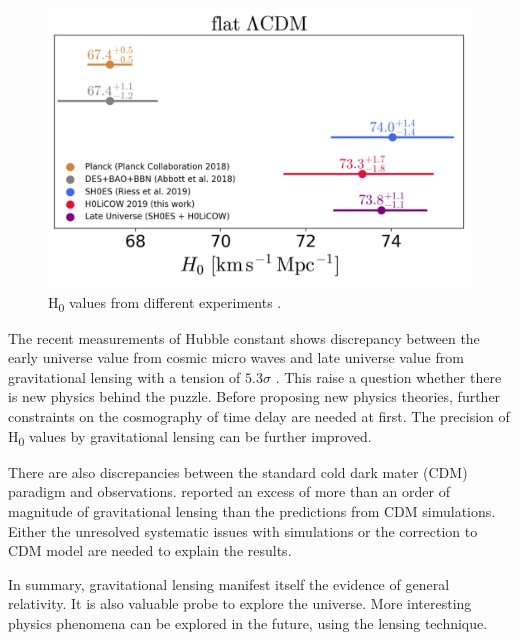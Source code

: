 \documentclass[letter,12pt]{article}
\begin{document}
\begin{figure}[htbp]
\centering
\includegraphics[width=.9\linewidth]{./figures/H0discrepancy.png}
\caption{\label{fig:orgcaf3856}H\textsubscript{0} values from different experiments \citep{Planck2018results,Abbott_2018,Riess_2019,Wong2019}.}
\end{figure}

The recent measurements of Hubble constant shows discrepancy between
the early universe value from cosmic micro waves and late universe
value from gravitational lensing with a tension of \(5.3\sigma\)
\citep{Wong2019}. This raise a question whether there is new physics
behind the puzzle. Before proposing new physics theories, further
constraints on the cosmography of time delay are needed at
first. The precision of H\textsubscript{0} values by gravitational lensing can be
further improved.

There are also discrepancies between the standard cold dark mater
(CDM) paradigm and observations. \cite{Meneghetti_2020} reported an
excess of more than an order of magnitude of gravitational lensing
than the predictions from CDM simulations. Either the unresolved
systematic issues with simulations or the correction to CDM model
are needed to explain the results.

In summary, gravitational lensing manifest itself the evidence of
general relativity. It is also valuable probe to explore the
universe. More interesting physics phenomena can be explored in the
future, using the lensing technique.



\end{document}
